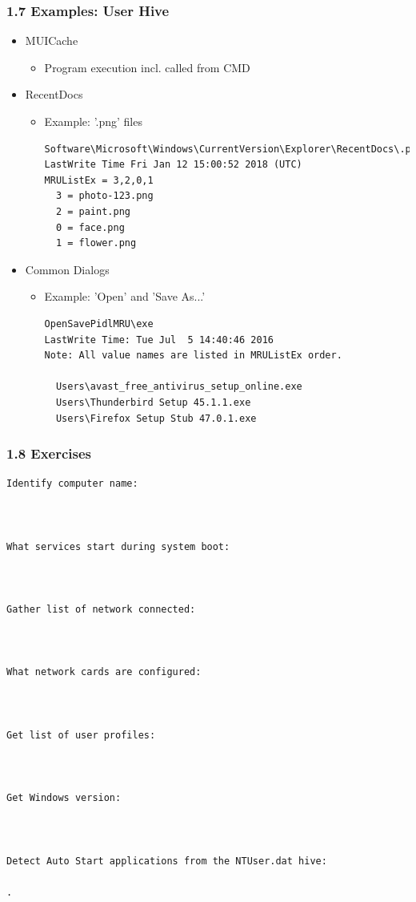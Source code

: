 \begin{frame}[fragile]
  \frametitle{1.7 Examples: User Hive}
   \begin{itemize}
      \item MUICache
        \begin{itemize}
          \item Program execution incl. called from CMD
        \end{itemize}
      \item RecentDocs
        \begin{itemize}
          \item[] Example: '.png' files
          \begin{lstlisting}[basicstyle=\tiny]
Software\Microsoft\Windows\CurrentVersion\Explorer\RecentDocs\.png
LastWrite Time Fri Jan 12 15:00:52 2018 (UTC)
MRUListEx = 3,2,0,1
  3 = photo-123.png
  2 = paint.png
  0 = face.png
  1 = flower.png
          \end{lstlisting}
        \end{itemize}
      \item Common Dialogs
        \begin{itemize}
          \item[] Example: 'Open' and 'Save As...'
          \begin{lstlisting}[basicstyle=\tiny]
OpenSavePidlMRU\exe
LastWrite Time: Tue Jul  5 14:40:46 2016
Note: All value names are listed in MRUListEx order.

  Users\avast_free_antivirus_setup_online.exe
  Users\Thunderbird Setup 45.1.1.exe
  Users\Firefox Setup Stub 47.0.1.exe
          \end{lstlisting}
        \end{itemize}
   \end{itemize}
\end{frame}


\begin{frame}[fragile]
  \frametitle{1.8 Exercises}
  \begin{lstlisting}[basicstyle=\tiny]
Identify computer name:



What services start during system boot:



Gather list of network connected:



What network cards are configured:



Get list of user profiles:



Get Windows version:



Detect Auto Start applications from the NTUser.dat hive:

.
  \end{lstlisting}
\end{frame}


